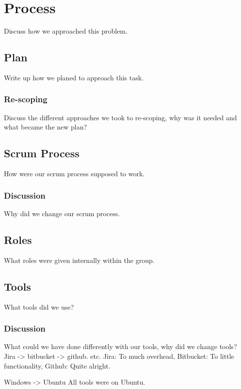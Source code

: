 \chapter{Process}
\label{chap:process}
Discuss how we approached this problem.

\section{Plan}
Write up how we planed to approach this task.

\subsection{Re-scoping}
Discuss the different approaches we took to re-scoping,
why was it needed and what became the new plan?

\section{Scrum Process}
How were our scrum process supposed to work.
\subsection{Discussion}
Why did we change our scrum process.

\section{Roles}
What roles were given internally within the group.

\section{Tools}
What tools did we use?

\subsection{Discussion}
What could we have done differently with our tools,
why did we change tools?
Jira -> bitbucket -> github. etc.
Jira: To much overhead,
Bitbucket: To little functionality,
Github: Quite alright.

Windows -> Ubuntu
All tools were on Ubuntu.

